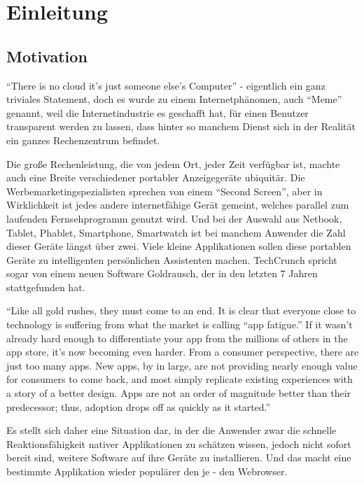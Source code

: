 \chapter{Einleitung}

\section{Motivation}
\label{sec:motivation}

 \enquote{There is no cloud it's just someone else's Computer} - eigentlich ein ganz triviales Statement, doch es wurde zu einem Internetphänomen, auch \enquote{Meme} genannt, weil die Internetindustrie es geschafft hat, für einen Benutzer transparent werden zu lassen, dass hinter so manchem Dienst sich in der Realität ein ganzes Rechenzentrum befindet.

Die große Rechenleistung, die von jedem Ort, jeder Zeit verfügbar ist, machte auch eine Breite verschiedener portabler Anzeigegeräte ubiquitär. Die Werbemarketingspezialisten sprechen von einem \enquote{Second Screen}, aber in Wirklichkeit ist jedes andere internetfähige Gerät gemeint, welches parallel zum laufenden Fernsehprogramm genutzt wird. Und bei der Auswahl aus Netbook, Tablet, Phablet, Smartphone, Smartwatch ist bei manchem Anwender die Zahl dieser Geräte längst über zwei. Viele kleine Applikationen sollen diese portablen Geräte zu intelligenten persönlichen Assistenten machen. TechCrunch spricht sogar von einem neuen Software Goldrausch, der in den letzten 7 Jahren stattgefunden hat.

\enquote{Like all gold rushes, they must come to an end. It is clear that everyone close to technology is suffering from what the market is calling “app fatigue.” If it wasn’t already hard enough to differentiate your app from the millions of others in the app store, it’s now becoming even harder. From a consumer perspective, there are just too many apps. New apps, by in large, are not providing nearly enough value for consumers to come back, and most simply replicate existing experiences with a story of a better design. Apps are not an order of magnitude better than their predecessor; thus, adoption drops off as quickly as it started.}  \cite{Schippers:2006}

Es stellt sich daher eine Situation dar, in der die Anwender zwar die schnelle Reaktionsfähigkeit nativer Applikationen zu schätzen wissen, jedoch nicht sofort bereit sind, weitere Software auf ihre Geräte zu installieren. Und das macht eine bestimmte Applikation wieder populärer den je - den Webrowser.

